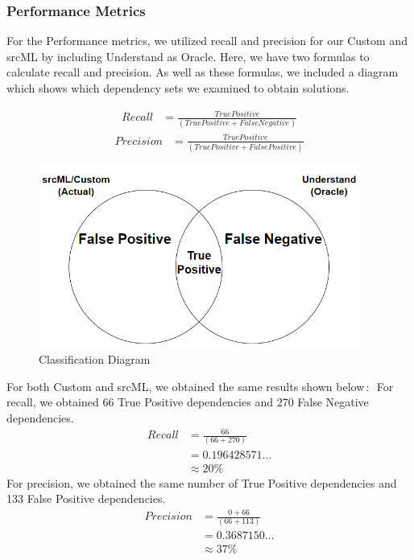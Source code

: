 \documentclass[12pt, dvipsnames, a4paper]{article}
\begin{document}
\subsubsection{Performance Metrics}
For the Performance metrics, we utilized recall and precision for our Custom and srcML by including Understand as Oracle.
Here, we have two formulas to calculate recall and precision. As well as these formulas, we included a diagram which shows which dependency sets we examined to obtain solutions.

\begin{equation*}
    \begin{split}
    Recall &= \frac{True Positive}{(True Positive + False Negative)}
    \end{split}
\end{equation*}
\newline
\begin{equation*}
    \begin{split}
    Precision &= \frac{True Positive}{(True Positive + False Positive)}
    \end{split}
\end{equation*}

\begin{figure}[h]
    \center
    \includegraphics[width=300pt]{assets/recall_precision_diagram.PNG}
    \caption{Classification Diagram}
\end{figure}

For both Custom and srcML, we obtained the same results shown below$\,\colon\,$
\newline
For recall, we obtained 66 True Positive dependencies and 270 False Negative dependencies. 
\begin{equation*}
    \begin{split}
    Recall &= \frac{66}{(66 + 270)}\\
    &= 0.196428571\dots\\
    &\approx 20\%
    \end{split}
\end{equation*}
For precision, we obtained the same number of True Positive dependencies and 133 False Positive dependencies.
\begin{equation*}
    \begin{split}
    Precision &= \frac{0 + 66}{(66 + 113)}\\
    &= 0.3687150\dots\\
    &\approx 37\%
    \end{split}
\end{equation*}
\end{document}
